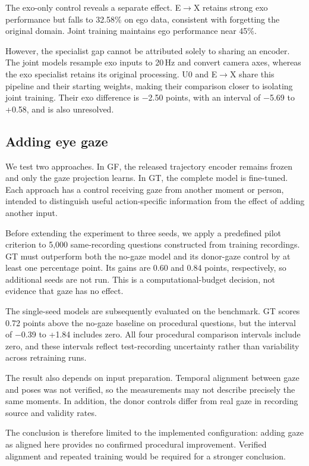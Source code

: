 \documentclass[10pt,twocolumn,letterpaper]{article}
\begin{document}
The exo-only control reveals a separate effect. E$\to$X retains strong exo performance but falls to 32.58\% on ego
data, consistent with forgetting the original domain. Joint training maintains ego performance near 45\%.

However, the specialist gap cannot be attributed solely to sharing an encoder. The joint models resample exo inputs
to 20\,Hz and convert camera axes, whereas the exo specialist retains its original processing. U0 and E$\to$X share
this pipeline and their starting weights, making their comparison closer to isolating joint training. Their exo
difference is $-$2.50 points, with an interval of $-$5.69 to +0.58, and is also unresolved.

\subsection{Adding eye gaze}
\label{sec:gaze}
We test two approaches. In GF, the released trajectory encoder remains frozen and only the gaze projection learns.
In GT, the complete model is fine-tuned. Each approach has a control receiving gaze from another moment or person,
intended to distinguish useful action-specific information from the effect of adding another input.

Before extending the experiment to three seeds, we apply a predefined pilot criterion to 5,000 same-recording
questions constructed from training recordings. GT must outperform both the no-gaze model and its donor-gaze
control by at least one percentage point. Its gains are 0.60 and 0.84 points, respectively, so additional seeds are
not run. This is a computational-budget decision, not evidence that gaze has no effect.

The single-seed models are subsequently evaluated on the benchmark. GT scores 0.72 points above the no-gaze baseline
on procedural questions, but the interval of $-$0.39 to +1.84 includes zero. All four procedural comparison
intervals include zero, and these intervals reflect test-recording uncertainty rather than variability across
retraining runs.

The result also depends on input preparation. Temporal alignment between gaze and poses was not verified, so the
measurements may not describe precisely the same moments. In addition, the donor controls differ from real gaze in
recording source and validity rates.

The conclusion is therefore limited to the implemented configuration: adding gaze as aligned here provides no
confirmed procedural improvement. Verified alignment and repeated training would be required for a stronger
conclusion.
\end{document}
